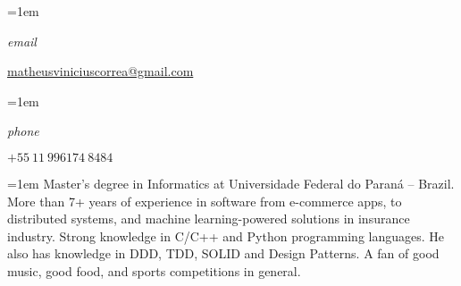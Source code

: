 \documentclass[fontsize=11pt,paper=a4]{scrartcl}
\date{} %
\newcommand{\ProfileInfo}[2]{\noindent\hangindent=1em\hangafter=0%
  \parbox{5em}{\small \textit{#1}\hspace{1em}} {\small #2}}
\newcommand{\Description}[1]{\hangindent=1em\hangafter=0%
  \noindent\RaggedRight\footnotesize{#1}\par\normalsize\vspace{.5em}}
\begin{document}
\pagestyle{scrheadings}


\begin{cv}{%
    \noindent%
  } %
  
  \noindent{%
  }
  
  \vspace{.5em}
  
  \ProfileInfo{email}{\href{mailto:matheusviniciuscorrea@gmail.com}{matheusviniciuscorrea@gmail.com}}


  \ProfileInfo{phone}{\(+55\ 11\ 996174\ 8484\)}

  \vspace{.5em}

  \noindent{}\vspace{.5em}
  
  \Description{%
    Master's degree in Informatics at Universidade Federal do Paraná --
    Brazil. More than 7+ years of experience in software from e-commerce
    apps, to distributed systems, and machine learning-powered solutions in
    insurance industry. Strong knowledge in C/C++ and Python programming
    languages. He also has knowledge in DDD, TDD, SOLID and Design Patterns.
    A fan of good music, good food, and sports
    competitions in general.%
  }


\end{cv}
\end{document}
